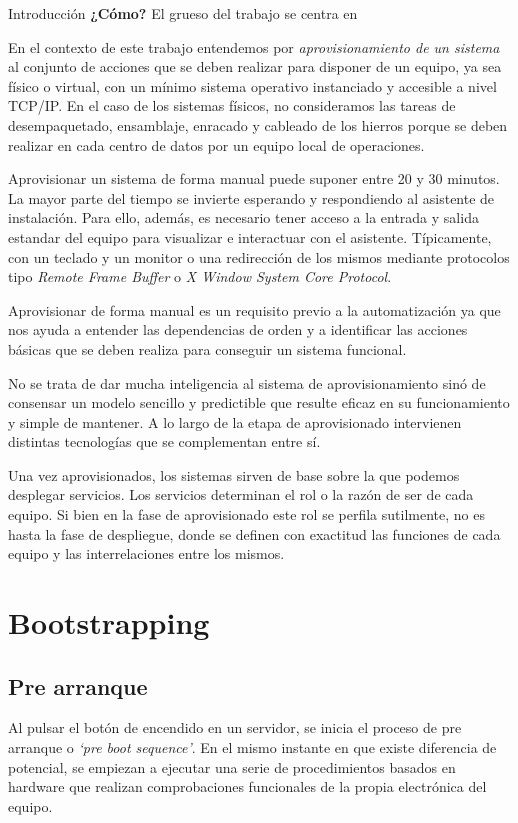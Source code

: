 \documentclass[a4paper,12pt,spanish,final]{epsc_tfc_pfc}
\begin{document}
\begin{intro}{Introducción}
\textbf{¿Cómo?} El grueso del trabajo se centra en 

En el contexto de este trabajo entendemos por \emph{aprovisionamiento de un sistema} al conjunto de acciones que se deben realizar para disponer de un equipo, ya sea físico o virtual, con un mínimo sistema operativo instanciado y accesible a nivel TCP/IP\@. En el caso de los sistemas físicos, no consideramos las tareas de desempaquetado, ensamblaje, enracado y cableado de los hierros porque se deben realizar en cada centro de datos por un equipo local de operaciones.

Aprovisionar un sistema de forma manual puede suponer entre 20 y 30 minutos. La mayor parte del tiempo se invierte esperando y respondiendo al asistente de instalación. Para ello, además, es necesario tener acceso a la entrada y salida estandar del equipo para visualizar e interactuar con el asistente. Típicamente, con un teclado y un monitor o una redirección de los mismos mediante protocolos tipo \emph{Remote Frame Buffer} o \emph{X Window System Core Protocol}.

Aprovisionar de forma manual es un requisito previo a la automatización ya que nos ayuda a entender las dependencias de orden y a identificar las acciones básicas que se deben realiza para conseguir un sistema funcional.

No se trata de dar mucha inteligencia al sistema de aprovisionamiento sinó de consensar un modelo sencillo y predictible que resulte eficaz en su funcionamiento y simple de mantener. A lo largo de la etapa de aprovisionado intervienen distintas tecnologías que se complementan entre sí.

Una vez aprovisionados, los sistemas sirven de base sobre la que podemos desplegar servicios. Los servicios determinan el rol o la razón de ser de cada equipo. Si bien en la fase de aprovisionado este rol se perfila sutilmente, no es hasta la fase de despliegue, donde se definen con exactitud las funciones de cada equipo y las interrelaciones entre los mismos.
\end{intro}

\pagestyle{fancy}


\chapter{Bootstrapping}
\section{Pre arranque}
Al pulsar el botón de encendido en un servidor, se inicia el proceso de pre arranque o \emph{`pre boot sequence'}. En el mismo instante en que existe diferencia de potencial, se empiezan a ejecutar una serie de procedimientos basados en hardware que realizan comprobaciones funcionales de la propia electrónica del equipo.
\end{document}
